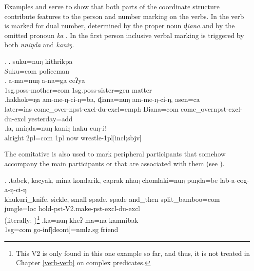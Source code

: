 Examples \Next[c] and \Next[d] serve to show that both parts of the  coordinate structure contribute features to the person and number marking on the verbs. In \Next[c] the verb is marked for dual number, determined by the proper noun \emph{ɖiana} and by the omitted pronoun \emph{ka} . In \Next[d] the first person inclusive verbal marking is triggered by both \emph{nniŋda} and \emph{kaniŋ}.

\ex. \ag.  suku=nuŋ   kithrikpa\\
Suku{\sc =com} policeman\\
 
		\bg. a-ma=nuŋ                a-na=ga                       ceʔya\\
{\sc 1sg.poss-}mother{\sc=com} {\sc 1sg.poss-}sister{\sc=gen} matter\\
		\bg.hakhok=ŋa  am-me-ŋ-ci-ŋ=ba,                          ɖiana=nuŋ     am-me-ŋ-ci-ŋ,                      asen=ca\\
		later{\sc =ins} come\_over{\sc -npst-excl-du-excl=emph} Diana{\sc =com} come\_over{\sc npst-excl-du-excl} yesterday{\sc =add}\\
		\bg.la,    nniŋda=nuŋ   kaniŋ haku cuŋ-iǃ\\
		alright {\sc 2pl=com} {\sc 1pl} now wrestle{\sc -1pl[incl;sbjv]}\\
			
The comitative is also used to mark peripheral participants that somehow accompany the main participants or that are associated with them (see \Next).

\ex. \ag.tabek,                 kacyak, mina  kondarik,               caprak                 nhaŋ    chomlaki=nuŋ       puŋda=be    lab-a-cog-a-ŋ-ci-ŋ\\
khukuri\_knife, sickle, small spade, spade and\_then split\_bamboo{\sc =com}  jungle{\sc =loc} hold{\sc -pst-V2.make-pst-excl-du-excl}\\
 (literally: )\footnote{This V2 is only found in this one example so far, and thus, it is not treated in Chapter \ref{verb-verb} on complex predicates.} 
\bg.ka=nuŋ kheʔ-ma=na kamnibak\\
{\sc 1sg=com} go{\sc -inf[deont]=nmlz.sg} friend\\
		
